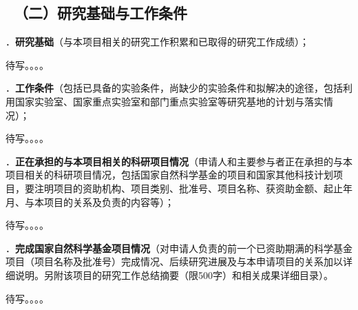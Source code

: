 {\color{MsBlue} \subsection{\texorpdfstring{\sihao \kaishu \quad \ （二）研究基础与工作条件 }{（二）研究基础与工作条件 }}}


{\sihao \color{MsBlue} ．{\bfseries 研究基础}（与本项目相关的研究工作积累和已取得的研究工作成绩）；}

待写。。。。

\vskip 5mm



{\sihao \color{MsBlue} ．{\bfseries 工作条件}（包括已具备的实验条件，尚缺少的实验条件和拟解决的途径，包括利用国家实验室、国家重点实验室和部门重点实验室等研究基地的计划与落实情况）；}

待写。。。。

\vskip 5mm



{\sihao \color{MsBlue} ．{\bfseries 正在承担的与本项目相关的科研项目情况}（申请人和主要参与者正在承担的与本项目相关的科研项目情况，包括国家自然科学基金的项目和国家其他科技计划项目，要注明项目的资助机构、项目类别、批准号、项目名称、获资助金额、起止年月、与本项目的关系及负责的内容等）；}

待写。。。。

\vskip 5mm



{\sihao \color{MsBlue} ．{\bfseries 完成国家自然科学基金项目情况}（对申请人负责的前一个已资助期满的科学基金项目（项目名称及批准号）完成情况、后续研究进展及与本申请项目的关系加以详细说明。另附该项目的研究工作总结摘要（限500字）和相关成果详细目录）。}

待写。。。。

\vskip 5mm
